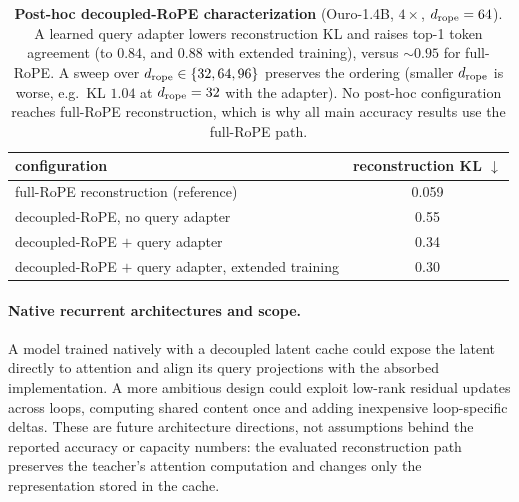 \documentclass[10pt]{article}
\begin{document}
\begin{table}[h]\centering\small
\caption{\textbf{Post-hoc decoupled-RoPE characterization} (Ouro-1.4B, $4\times$, $d_{\rm rope}=64$). A learned query adapter lowers reconstruction KL and raises top-1 token agreement (to $0.84$, and $0.88$ with extended training), versus ${\sim}0.95$ for full-RoPE. A sweep over $d_{\rm rope}\in\{32,64,96\}$ preserves the ordering (smaller $d_{\rm rope}$ is worse, e.g.\ KL $1.04$ at $d_{\rm rope}=32$ with the adapter). No post-hoc configuration reaches full-RoPE reconstruction, which is why all main accuracy results use the full-RoPE path.}
\label{tab:decoupled_char}
\begin{tabular}{lc}
\toprule
configuration & reconstruction KL $\downarrow$ \\
\midrule
full-RoPE reconstruction (reference) & 0.059 \\
decoupled-RoPE, no query adapter & 0.55 \\
decoupled-RoPE $+$ query adapter & 0.34 \\
decoupled-RoPE $+$ query adapter, extended training & 0.30 \\
\bottomrule
\end{tabular}
\end{table}

\paragraph{Native recurrent architectures and scope.}
A model trained natively with a decoupled latent cache could expose the latent directly to attention and align its query projections with the absorbed implementation. A more ambitious design could exploit low-rank residual updates across loops, computing shared content once and adding inexpensive loop-specific deltas. These are future architecture directions, not assumptions behind the reported accuracy or capacity numbers: the evaluated reconstruction path preserves the teacher's attention computation and changes only the representation stored in the cache.
\end{document}
